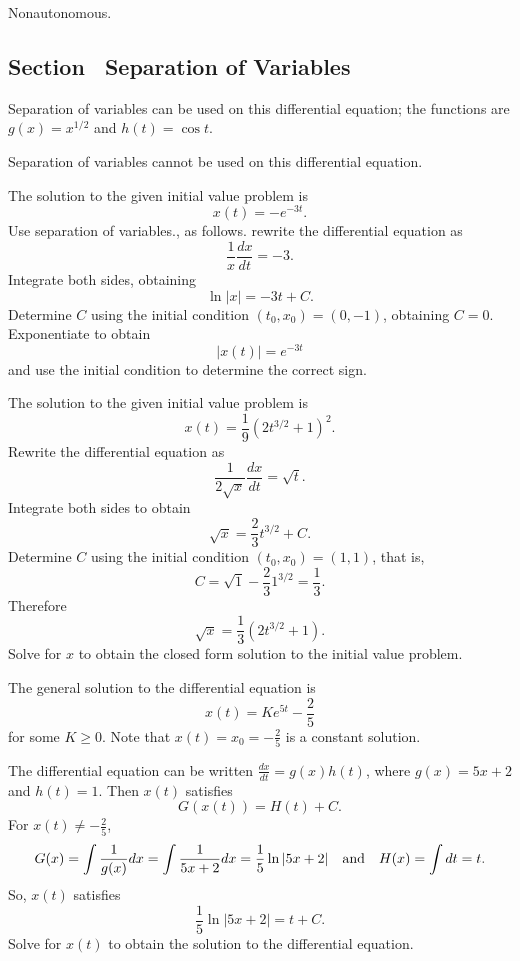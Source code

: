 \documentclass{ximera}
\begin{document}
\begin{figure}[ht]
     \centerline{%
     }
\end{figure} 

 Nonautonomous.



\subsection*{Section~\protect{\ref{sec:sov}} Separation of Variables}

 \ans Separation of variables can be used on this differential
equation; the functions are $g(x) = x^{1/2}$ and $h(t) = \cos t$.

 \ans Separation of variables cannot be used on this
differential equation.

 \ans The solution to the given initial value problem is
\[
x(t) = -e^{-3t}.
\]
\soln Use separation of variables., as follows.  rewrite the differential 
equation as
\[
\frac{1}{x}\frac{dx}{dt} = -3.
\]
Integrate both sides, obtaining 
\[
\ln|x| = -3t + C.
\]
Determine $C$ using the initial condition $(t_0,x_0)=(0,-1)$, obtaining
$C=0$.  Exponentiate to obtain 
\[
|x(t)| = e^{-3t}
\]
and use the initial condition to determine the correct sign.

 \ans The solution to the given initial value problem is
\[
x(t) = \frac{1}{9}(2t^{3/2} + 1)^2.
\]
\soln Rewrite the differential equation as 
\[
\frac{1}{2\sqrt{x}}\frac{dx}{dt} = \sqrt{t}.
\]
Integrate both sides to obtain
\[
\sqrt{x} = \frac{2}{3}t^{3/2} + C.
\]
Determine $C$ using the initial condition $(t_0,x_0)=(1,1)$, that is,
\[
C = \sqrt{1} - \frac{2}{3}1^{3/2} = \frac{1}{3}.
\]
Therefore
\[
\sqrt{x} = \frac{1}{3}(2t^{3/2} + 1).
\]
Solve for $x$ to obtain the closed form solution to the initial value problem.

 \ans The general solution to the differential equation is 
\[
x(t) = Ke^{5t} - \frac{2}{5}
\]
for some $K \geq 0$.  Note that $x(t) = x_0 = -\frac{2}{5}$ is a constant
solution.

\soln The differential equation can be written $\frac{dx}{dt} = g(x)h(t)$,
where $g(x) = 5x + 2$ and $h(t) = 1$.  Then $x(t)$ satisfies
\[
G(x(t)) = H(t) + C.
\]
For $x(t) \neq -\frac{2}{5}$,
\[
G(x) = \int\frac{1}{g(x)}dx = \int\frac{1}{5x + 2}dx = \frac{1}{5}\ln|5x + 2|
\quad\mbox{and}\quad
H(x) = \int dt = t.
\]
So, $x(t)$ satisfies
\[
\frac{1}{5}\ln|5x + 2| = t + C.
\]
Solve for $x(t)$ to obtain the solution to the differential equation.
\end{document}
